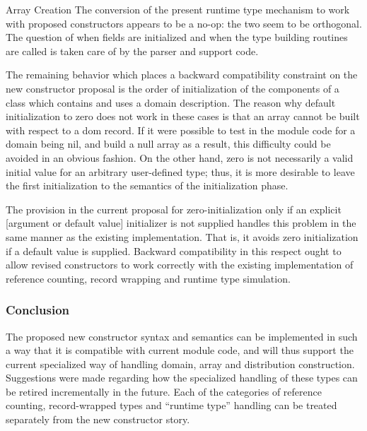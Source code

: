 \begin{chapelexample}{Array Creation}
The conversion of the present runtime type mechanism to work with proposed
constructors appears to be a no-op: the two seem to be orthogonal.  The
question of when fields are initialized and when the type building routines are
called is taken care of by the parser and support code.
\end{chapelexample}

The remaining behavior which places a backward compatibility constraint on the
new constructor proposal is the order of initialization of the components of a
class which contains and uses a domain description.  The reason why default
initialization to zero does not work in these cases is that an array cannot be
built with respect to a  dom record.  If it were possible to test in the module code
for a domain being nil, and build a null array as a result, this difficulty
could be avoided in an obvious fashion.  On the other hand, zero is not
necessarily a valid initial value for an arbitrary user-defined type; thus, it
is more desirable to leave the first initialization to the semantics of the
initialization phase.

The provision in the current proposal for zero-initialization only if an
explicit [argument or default value] initializer is not supplied handles this
problem in the same manner as the existing implementation.  That is, it avoids
zero initialization if a default value is supplied.  Backward compatibility in
this respect ought to allow revised constructors to work correctly with the
existing implementation of reference counting, record wrapping and runtime type
simulation.

\subsubsection{Conclusion}

The proposed new constructor syntax and semantics can be
implemented in such a way that it is compatible with current module code, and
will thus support the current specialized way of handling domain, array and
distribution construction.  Suggestions were made 
regarding how the specialized handling of these types can be retired
incrementally in the future.  Each of the categories of reference counting,
record-wrapped types and ``runtime type'' handling can be treated separately
from the new constructor story.
